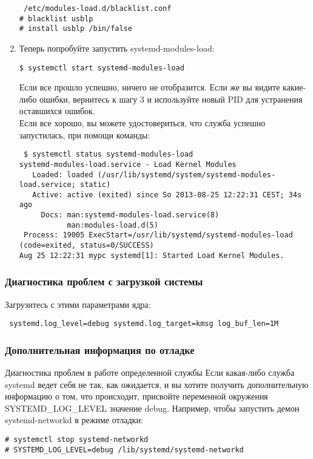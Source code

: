 \documentclass[a4paper,10pt,twoside]{article}
\begin{document}
\begin{enumerate}
\begin{verbatim}
 /etc/modules-load.d/blacklist.conf
# blacklist usblp
# install usblp /bin/false
\end{verbatim} 
\item Теперь попробуйте запустить systemd-modules-load:
\begin{verbatim}
$ systemctl start systemd-modules-load
\end{verbatim} 
Если все прошло успешно, ничего не отобразится. Если же вы видите какие-либо ошибки, вернитесь к шагу 3 и используйте новый PID для устранения оставшихся ошибок.\\
Если все хорошо, вы можете удостовериться, что служба успешно запустилась, при помощи команды:
\begin{verbatim}
 $ systemctl status systemd-modules-load
systemd-modules-load.service - Load Kernel Modules
   Loaded: loaded (/usr/lib/systemd/system/systemd-modules-load.service; static)
   Active: active (exited) since So 2013-08-25 12:22:31 CEST; 34s ago
     Docs: man:systemd-modules-load.service(8)
           man:modules-load.d(5)
 Process: 19005 ExecStart=/usr/lib/systemd/systemd-modules-load (code=exited, status=0/SUCCESS)
Aug 25 12:22:31 mypc systemd[1]: Started Load Kernel Modules.
\end{verbatim} 
\end{enumerate}

\subsubsection{Диагностика проблем с загрузкой системы}
Загрузитесь с этими параметрами ядра:

\begin{verbatim}
 systemd.log_level=debug systemd.log_target=kmsg log_buf_len=1M
\end{verbatim} 

\subsubsection{Дополнительная информация по отладке}

Диагностика проблем в работе определенной службы
Если какая-либо служба systemd ведет себя не так, как ожидается, и вы хотите получить дополнительную информацию о том, что происходит, присвойте переменной окружения SYSTEMD\_LOG\_LEVEL значение debug. Например, чтобы запустить демон systemd-networkd в режиме отладки:

\begin{verbatim}
# systemctl stop systemd-networkd
# SYSTEMD_LOG_LEVEL=debug /lib/systemd/systemd-networkd
\end{verbatim} 
\end{document}
